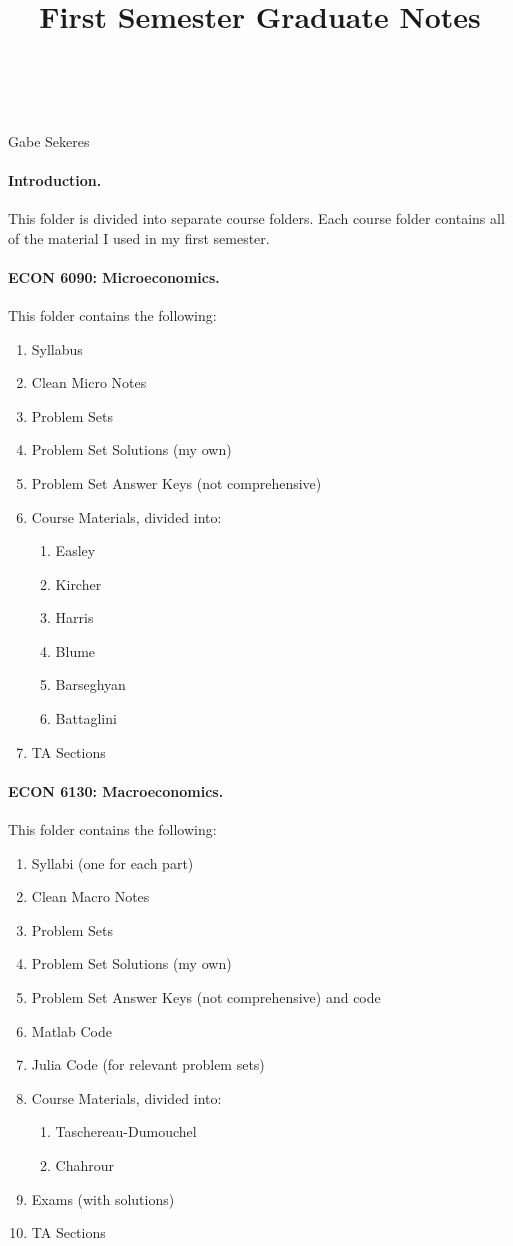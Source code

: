 \documentclass[12pt]{article}
\title{First Semester Graduate Notes}
\makeatletter
\renewcommand{\maketitle}{
    \begin{tcolorbox}[colback=purple!5!white,colframe=black]
        \begin{center}
            \textbf{\@course} \\[0.25em]
            {\Large\textit{\@entitle}} \\[0.5em]
            Gabe Sekeres \\[0.5em]
            \@term
        \end{center}
    \end{tcolorbox}
    \vspace{1em}
}
\makeatother
\begin{document}
	\maketitle
	
	\paragraph{Introduction.} This folder is divided into separate course folders. Each course folder contains all of the material I used in my first semester.
	
	\paragraph{ECON 6090: Microeconomics.} This folder contains the following:
	\begin{enumerate}
		\item Syllabus
		\item Clean Micro Notes
		\item Problem Sets
		\item Problem Set Solutions (my own)
		\item Problem Set Answer Keys (not comprehensive)
		\item Course Materials, divided into:
		\begin{enumerate}
			\item Easley
			\item Kircher
			\item Harris
			\item Blume
			\item Barseghyan
			\item Battaglini
		\end{enumerate}
		\item TA Sections
	\end{enumerate}
	
	\paragraph{ECON 6130: Macroeconomics.} This folder contains the following:
	\begin{enumerate}
		\item Syllabi (one for each part)
		\item Clean Macro Notes
		\item Problem Sets
		\item Problem Set Solutions (my own)
		\item Problem Set Answer Keys (not comprehensive) and code
		\item Matlab Code
		\item Julia Code (for relevant problem sets)
		\item Course Materials, divided into:
		\begin{enumerate}
			\item Taschereau-Dumouchel
			\item Chahrour
		\end{enumerate}
		\item Exams (with solutions)
		\item TA Sections
	\end{enumerate}
	
\end{document}
